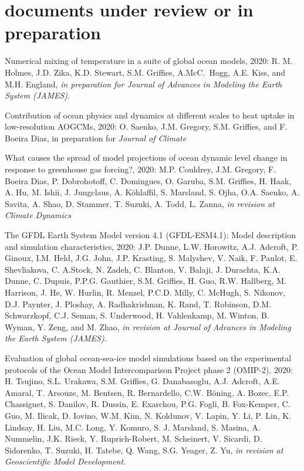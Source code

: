 \section*{\sc \color{Maroon} documents under review or in preparation}

\small 


\begin{etaremune}

\item Numerical mixing of temperature in a suite of global ocean models, 2020: R. M. Holmes, J.D. Zika, K.D. Stewart, S.M. Griffies,  A.McC.\ Hogg, A.E. Kiss, and M.H. England,
{\it in preparation for Journal of Advances in Modeling the Earth System (JAMES)}.

\item Contribution of ocean physics and dynamics at different scales to heat uptake in low-resolution AOGCMs, 2020: O. Saenko, J.M. Gregory, S.M. Griffies, and F.  Boeira Dias, in preparation for {\it Journal of Climate}

\item What causes the spread of model projections of ocean dynamic level change in response to greenhouse gas forcing?, 2020:  M.P. Couldrey, J.M. Gregory,  F. Boeira Dias, P. Dobrohotoff, C. Domingues, O. Garuba, S.M. Griffies, H. Haak, A. Hu, M. Ishii, J. Jungclaus, A. {K\"{o}hlaffil}, S. Marsland, S. Ojha, O.A. Saenko, A. Savita, A. Shao, D. Stammer, T. Suzuki, A. Todd, L. Zanna, {\it in revision at Climate Dynamics}

\item The GFDL Earth System Model version 4.1 (GFDL-ESM4.1): Model description and simulation characteristics, 2020: J.P. Dunne, L.W. Horowitz, A.J. Adcroft, P. Ginoux, I.M. Held, J.G. John, J.P. Krasting, S. Malyshev, V. Naik, F. Paulot, E. Shevliakova, C. A.Stock, N. Zadeh, C. Blanton, V. Balaji, J. Durachta, K.A. Dunne, C. Dupuis, P.P.G. Gauthier, S.M. Griffies, H. Guo, R.W. Hallberg, M. Harrison, J. He, W. Hurlin, R. Menzel, P.C.D. Milly, C. McHugh, S. Nikonov, D.J. Paynter, J. Ploshay, A. Radhakrishnan, K. Rand, T. Robinson, D.M. Schwarzkopf, C.J. Seman, S. Underwood, H. Vahlenkamp, M. Winton, B. Wyman, Y. Zeng, and M. Zhao, {\it in revision at Journal of Advances in Modeling the Earth System (JAMES)}.

\item Evaluation of global ocean-sea-ice model simulations based on the experimental protocols of the Ocean Model Intercomparison Project phase 2 (OMIP-2), 2020: H. Tsujino, S.L. Urakawa, S.M. Griffies, G. Danabasoglu, A.J. Adcroft, A.E. Amaral, T. Arsouze, M. Bentsen, R. Bernardello, C.W. {B\"{o}ning}, A. Bozec, E.P. Chassignet, S. Danilov, R. Dussin, E. Exarchou, P.G. Fogli, B. Fox-Kemper, C. Guo, M. Ilicak, D. Iovino, W.M. Kim, N. Koldunov, V. Lapin, Y. Li, P. Lin, K. Lindsay, H. Liu, M.C. Long, Y. Komuro, S. J. Marsland, S. Masina, A. Nummelin, J.K. Rieck, Y. Ruprich-Robert, M. Scheinert, V. Sicardi, D. Sidorenko, T. Suzuki, H. Tatebe, Q. Wang, S.G. Yeager, Z. Yu, {\it in revision at Geoscientific Model Development}.


\end{etaremune}
